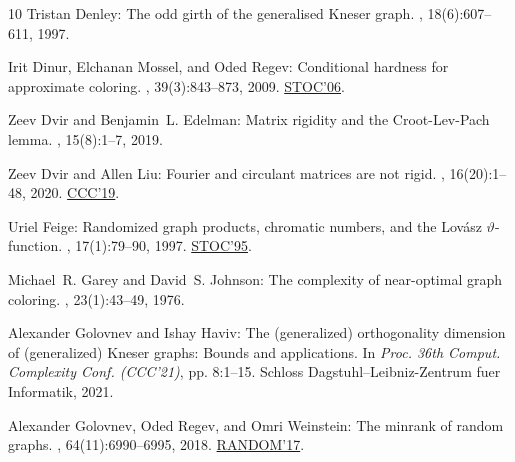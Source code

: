 \begin{thebibliography}{10}
{\sc Tristan Denley}: The odd girth of the generalised {K}neser graph.
, 18(6):607--611, 1997.

{\sc Irit Dinur, Elchanan Mossel, and Oded Regev}: Conditional hardness for
  approximate coloring.
, 39(3):843--873, 2009.
\newblock \prelim \href{https:doi.org/10.1145/1132516.1132567}{STOC'06}.
\newblock [\epfmtdoi{10.1137/07068062X}]

{\sc Zeev Dvir and Benjamin~L. Edelman}: Matrix rigidity and the
  {Croot-Lev-Pach} lemma.
, 15(8):1--7, 2019.

{\sc Zeev Dvir and Allen Liu}: Fourier and circulant matrices are not rigid.
, 16(20):1--48, 2020.
\newblock \prelim \href{https:doi.org/10.4230/LIPIcs.CCC.2019.17}{CCC'19}.

{\sc Uriel Feige}: Randomized graph products, chromatic numbers, and the
  {L}ov{\'{a}}sz $\vartheta$-function.
, 17(1):79--90, 1997.
\newblock \prelim \href{https:doi.org/10.1145/225058.225281}{STOC'95}.
\newblock [\epfmtdoi{10.1007/BF01196133}]

{\sc Michael~R. Garey and David~S. Johnson}: The complexity of near-optimal
  graph coloring.
, 23(1):43--49, 1976.
\newblock [\epfmtdoi{10.1145/321921.321926}]

{\sc Alexander Golovnev and Ishay Haviv}: The (generalized) orthogonality
  dimension of (generalized) {K}neser graphs: Bounds and applications.
\newblock In {\em Proc. 36th Comput. Complexity Conf. (CCC'21)}, pp. 8:1--15.
  Schloss Dagstuhl--Leibniz-Zentrum fuer Informatik, 2021.

{\sc Alexander Golovnev, Oded Regev, and Omri Weinstein}: The minrank of random
  graphs.
, 64(11):6990--6995, 2018.
\newblock \prelim
  \href{https:doi.org/10.4230/LIPIcs.APPROX-RANDOM.2017.46}{RANDOM'17}.


\end{thebibliography}
